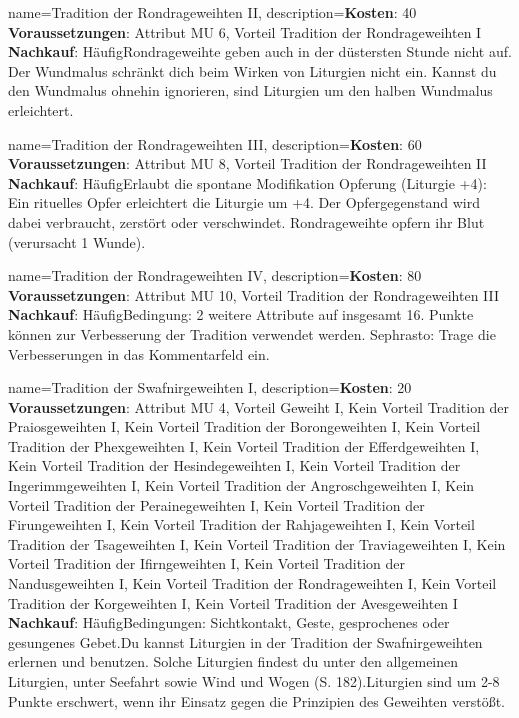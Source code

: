 {
    name={Tradition der Rondrageweihten II},
    description={\textbf{Kosten}: 40 \textbf{Voraussetzungen}: Attribut MU 6, Vorteil Tradition der Rondrageweihten I \textbf{Nachkauf}: Häufig\newline Rondrageweihte geben auch in der düstersten Stunde nicht auf. Der Wundmalus schränkt dich beim Wirken von Liturgien nicht ein. Kannst du den Wundmalus ohnehin ignorieren, sind Liturgien um den halben Wundmalus erleichtert.}
}


{
    name={Tradition der Rondrageweihten III},
    description={\textbf{Kosten}: 60 \textbf{Voraussetzungen}: Attribut MU 8, Vorteil Tradition der Rondrageweihten II \textbf{Nachkauf}: Häufig\newline Erlaubt die spontane Modifikation Opferung (Liturgie +4): Ein rituelles Opfer erleichtert die Liturgie um +4. Der Opfergegenstand wird dabei verbraucht, zerstört oder verschwindet. Rondrageweihte opfern ihr Blut (verursacht 1 Wunde).}
}


{
    name={Tradition der Rondrageweihten IV},
    description={\textbf{Kosten}: 80 \textbf{Voraussetzungen}: Attribut MU 10, Vorteil Tradition der Rondrageweihten III \textbf{Nachkauf}: Häufig\newline Bedingung: 2 weitere Attribute auf insgesamt 16. Punkte können zur Verbesserung der Tradition verwendet werden. Sephrasto: Trage die Verbesserungen in das Kommentarfeld ein.}
}


{
    name={Tradition der Swafnirgeweihten I},
    description={\textbf{Kosten}: 20 \textbf{Voraussetzungen}: Attribut MU 4, Vorteil Geweiht I, Kein Vorteil Tradition der Praiosgeweihten I, Kein Vorteil Tradition der Borongeweihten I, Kein Vorteil Tradition der Phexgeweihten I, Kein Vorteil Tradition der Efferdgeweihten I, Kein Vorteil Tradition der Hesindegeweihten I, Kein Vorteil Tradition der Ingerimmgeweihten I, Kein Vorteil Tradition der Angroschgeweihten I, Kein Vorteil Tradition der Perainegeweihten I, Kein Vorteil Tradition der Firungeweihten I, Kein Vorteil Tradition der Rahjageweihten I, Kein Vorteil Tradition der Tsageweihten I, Kein Vorteil Tradition der Traviageweihten I, Kein Vorteil Tradition der Ifirngeweihten I, Kein Vorteil Tradition der Nandusgeweihten I, Kein Vorteil Tradition der Rondrageweihten I, Kein Vorteil Tradition der Korgeweihten I, Kein Vorteil Tradition der Avesgeweihten I \textbf{Nachkauf}: Häufig\newline Bedingungen: Sichtkontakt, Geste, gesprochenes oder gesungenes Gebet.\newline Du kannst Liturgien in der Tradition der Swafnirgeweihten erlernen und benutzen. Solche Liturgien findest du unter den allgemeinen Liturgien, unter Seefahrt sowie Wind und Wogen (S. 182).\newline Liturgien sind um 2-8 Punkte erschwert, wenn ihr Einsatz gegen die Prinzipien des Geweihten verstößt.}
}


